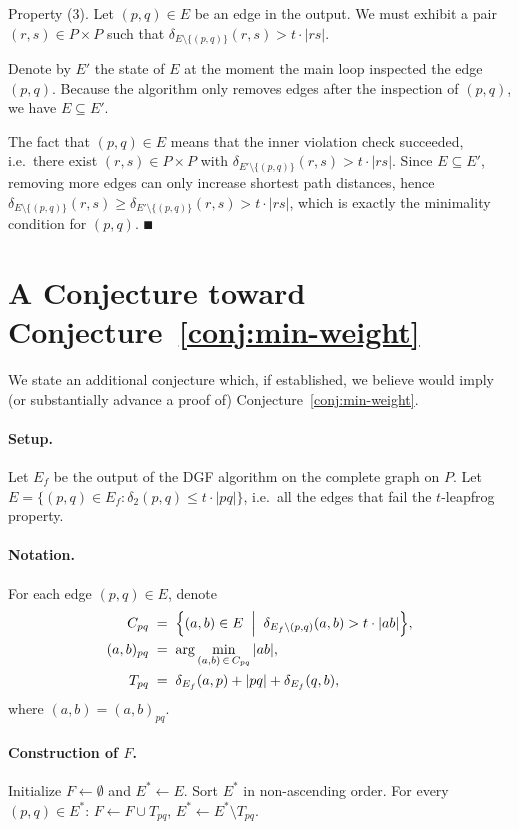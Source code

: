 \documentclass{cccg26}
\begin{document}
Property (3). Let $(p,q)\in E$ be an edge in the output. We must
exhibit a pair $(r,s)\in P\times P$ such that
$\delta_{E\setminus\{(p,q)\}}(r,s)>t\cdot|rs|$.

Denote by $E'$ the state of $E$ at the moment the main loop inspected
the edge $(p,q)$. Because the algorithm only removes edges after the
inspection of $(p,q)$, we have $E\subseteq E'$.

The fact that $(p,q)\in E$ means that the inner violation check
succeeded, i.e.\ there exist $(r,s)\in P\times P$ with
$\delta_{E'\setminus\{(p,q)\}}(r,s) > t\cdot|rs|$.
Since $E\subseteq E'$, removing more edges can only increase shortest
path distances, hence
$\delta_{E\setminus\{(p,q)\}}(r,s) \ge
\delta_{E'\setminus\{(p,q)\}}(r,s) > t\cdot|rs|$,
which is exactly the minimality condition for $(p,q)$.
\hfill$\QED$


\section{A Conjecture toward Conjecture~\ref{conj:min-weight}}
\label{app:toward-min-weight}

We state an additional conjecture which, if established, we believe
would imply (or substantially advance a proof of)
Conjecture~\ref{conj:min-weight}.

\paragraph{Setup.}
Let $E_f$ be the output of the DGF algorithm on the complete graph on
$P$. Let $E = \{(p,q) \in E_f : \delta_2(p,q) \leq t \cdot |pq|\}$,
i.e.\ all the edges that fail the $t$-leapfrog property.

\paragraph{Notation.}
For each edge $(p,q) \in E$, denote
\begin{align*}
  C_{pq} &\;=\; \Bigl\{(a,b) \in E \;\Bigm|\;
    \delta_{E_f\setminus(p,q)}(a,b) > t \cdot |ab|\Bigr\}, \\
  (a,b)_{pq} &\;=\; \arg\min_{(a,b)\,\in\, C_{pq}} |ab|, \\
  T_{pq} &\;=\; \delta_{E_f}(a,p) + |pq| + \delta_{E_f}(q,b),
\end{align*}
where $(a,b)=(a,b)_{pq}$.

\paragraph{Construction of $F$.}
Initialize $F \gets \emptyset$ and $E^* \gets E$. Sort $E^*$ in
non-ascending order. For every $(p,q) \in E^*$:
$F \gets F \cup T_{pq}$, $E^* \gets E^* \setminus T_{pq}$.
\end{document}
